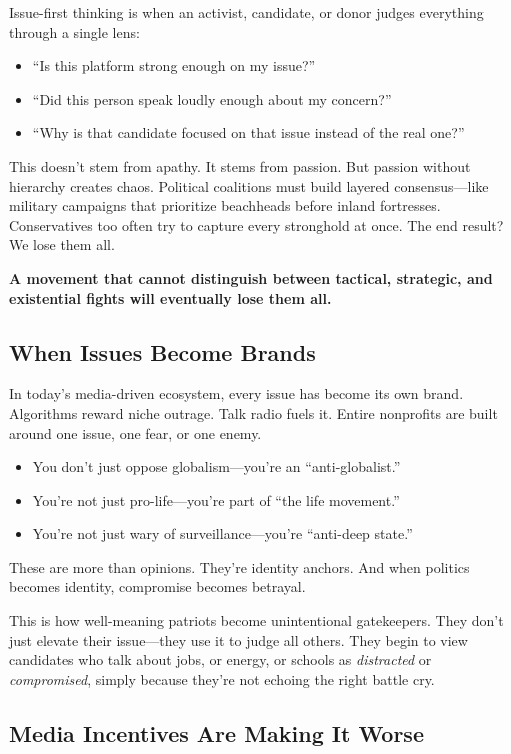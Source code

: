 Issue-first thinking is when an activist, candidate, or donor judges everything through a single lens:  
\begin{itemize}
    \item ``Is this platform strong enough on my issue?''
    \item ``Did this person speak loudly enough about my concern?''
    \item ``Why is that candidate focused on that issue instead of the real one?''
\end{itemize}

This doesn't stem from apathy. It stems from passion. But passion without hierarchy creates chaos. Political coalitions must build layered consensus—like military campaigns that prioritize beachheads before inland fortresses. Conservatives too often try to capture every stronghold at once. The end result? We lose them all.

\textbf{A movement that cannot distinguish between tactical, strategic, and existential fights will eventually lose them all.}

\subsection*{When Issues Become Brands}

In today's media-driven ecosystem, every issue has become its own brand. Algorithms reward niche outrage. Talk radio fuels it. Entire nonprofits are built around one issue, one fear, or one enemy.  
\begin{itemize}
    \item You don’t just oppose globalism—you’re an “anti-globalist.”
    \item You’re not just pro-life—you’re part of “the life movement.”
    \item You’re not just wary of surveillance—you’re “anti-deep state.”
\end{itemize}

These are more than opinions. They're identity anchors. And when politics becomes identity, compromise becomes betrayal.

This is how well-meaning patriots become unintentional gatekeepers. They don’t just elevate their issue—they use it to judge all others. They begin to view candidates who talk about jobs, or energy, or schools as \textit{distracted} or \textit{compromised}, simply because they’re not echoing the right battle cry.

\subsection*{Media Incentives Are Making It Worse}

